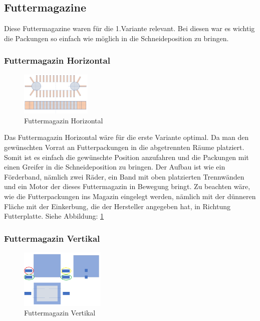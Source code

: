 \subsection{Futtermagazine}

Diese Futtermagazine waren für die 1.Variante relevant. Bei diesen war es wichtig die Packungen so einfach wie möglich in die Schneideposition zu bringen. 

\subsubsection{Futtermagazin Horizontal}

\begin{figure}
\vspace{-40pt}
  \begin{center}
    \includegraphics[width=0.30\textwidth]{Bilder/Powerpoint/Futtermagazin_horizontal}
  \end{center}
  \caption{Futtermagazin Horizontal}
  \label{Magazin Horizontal}
  \vspace{-10pt}
\end{figure} 

Das Futtermagazin Horizontal wäre für die erste Variante optimal. Da man den gewünschten Vorrat an Futterpackungen in die abgetrennten Räume platziert. Somit ist es einfach die gewünschte Position anzufahren und die Packungen mit einen Greifer in die Schneideposition zu bringen. Der Aufbau ist wie ein Förderband, nämlich zwei Räder, ein Band mit oben platzierten Trennwänden und ein Motor der dieses Futtermagazin in Bewegung bringt. Zu beachten wäre, wie die Futterpackungen ins Magazin eingelegt werden, nämlich mit der dünneren Fläche mit der Einkerbung, die der Hersteller angegeben hat, in Richtung Futterplatte. Siehe Abbildung: \ref{Magazin Horizontal}

\subsubsection{Futtermagazin Vertikal}

\begin{figure}
\vspace{-40pt}
  \begin{center}
    \includegraphics[width=0.36\textwidth]{Bilder/Powerpoint/Futtermagazin_vertikal}
  \end{center}
  \caption{Futtermagazin Vertikal}
  \label{Magazin Vertikal}
  \vspace{-10pt}
\end{figure}

